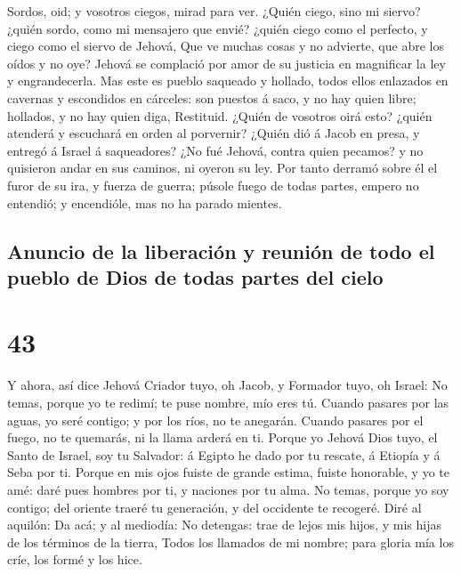  Sordos, oid; y vosotros ciegos, mirad para ver.
 ¿Quién ciego, sino mi siervo? ¿quién sordo, como mi
mensajero que envié? ¿quién ciego como el perfecto, y ciego como el
siervo de Jehová,  Que ve muchas cosas y no advierte, que
abre los oídos y no oye?  Jehová se complació por amor de
su justicia en magnificar la ley y engrandecerla.  Mas
este es pueblo saqueado y hollado, todos ellos enlazados en cavernas y
escondidos en cárceles: son puestos á saco, y no hay quien libre;
hollados, y no hay quien diga, Restituid.  ¿Quién de
vosotros oirá esto? ¿quién atenderá y escuchará en orden al porvernir?
 ¿Quién dió á Jacob en presa, y entregó á Israel á
saqueadores? ¿No fué Jehová, contra quien pecamos? y no quisieron andar
en sus caminos, ni oyeron su ley.  Por tanto derramó
sobre él el furor de su ira, y fuerza de guerra; púsole fuego de todas
partes, empero no entendió; y encendióle, mas no ha parado mientes.

\hypertarget{anuncio-de-la-liberaciuxf3n-y-reuniuxf3n-de-todo-el-pueblo-de-dios-de-todas-partes-del-cielo}{%
\subsection{Anuncio de la liberación y reunión de todo el pueblo de Dios
de todas partes del
cielo}\label{anuncio-de-la-liberaciuxf3n-y-reuniuxf3n-de-todo-el-pueblo-de-dios-de-todas-partes-del-cielo}}

\hypertarget{section-23-43}{%
\section{43}\label{section-23-43}}

 Y ahora, así dice Jehová Criador tuyo, oh Jacob, y
Formador tuyo, oh Israel: No temas, porque yo te redimí; te puse nombre,
mío eres tú.  Cuando pasares por las aguas, yo seré
contigo; y por los ríos, no te anegarán. Cuando pasares por el fuego, no
te quemarás, ni la llama arderá en ti.  Porque yo Jehová
Dios tuyo, el Santo de Israel, soy tu Salvador: á Egipto he dado por tu
rescate, á Etiopía y á Seba por ti.  Porque en mis ojos
fuiste de grande estima, fuiste honorable, y yo te amé: daré pues
hombres por ti, y naciones por tu alma.  No temas, porque
yo soy contigo; del oriente traeré tu generación, y del occidente te
recogeré.  Diré al aquilón: Da acá; y al mediodía: No
detengas: trae de lejos mis hijos, y mis hijas de los términos de la
tierra,  Todos los llamados de mi nombre; para gloria mía
los críe, los formé y los hice.

